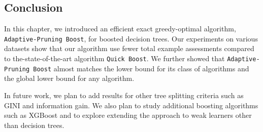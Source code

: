 
\subsection{Conclusion}
In this chapter, we introduced an efficient exact greedy-optimal algorithm, \texttt{Adaptive-Pruning Boost}, for boosted decision trees. Our experiments on various datasets show that our algorithm use fewer total example assessments compared to the-state-of-the-art algorithm \texttt{Quick Boost}. We further showed that \texttt{Adaptive-Pruning Boost} almost matches the lower bound for its class of algorithms and the global lower bound for any algorithm.

In future work, we plan to add results for other tree splitting criteria
such as GINI and information gain.
We also plan to study additional boosting algorithms such as XGBoost
and to explore extending the approach to weak learners other than decision
trees.
